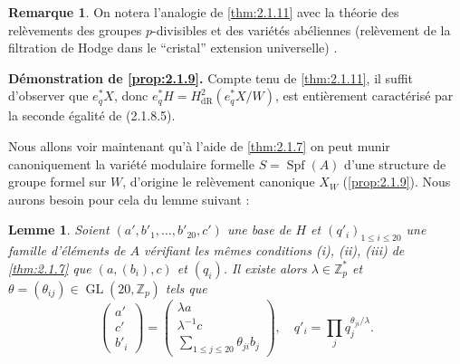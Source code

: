\documentclass[12pt,a4paper]{article}
\theoremstyle{plain}
\newtheorem{lemma}[theorem]{Lemme}
\theoremstyle{definition}
\newtheorem{remark}[theorem]{Remarque}
\theoremstyle{remark}
\DeclareMathOperator{\Spf}{Spf}
\providecommand{\GL}{\operatorname{GL}}
\begin{document}
\begin{remark}
On notera l'analogie de \ref{thm:2.1.11} avec la th\'eorie des rel\`evements des groupes $p$-divisibles et des vari\'et\'es ab\'eliennes (rel\`evement de la filtration de Hodge dans le ``cristal'' extension universelle) \cite{Messing}.
\end{remark}

\textbf{D\'emonstration de \ref{prop:2.1.9}.} Compte tenu de \ref{thm:2.1.11}, il suffit d'observer que $e_q^*X$, donc $e_q^* H = H^2_\mathrm{dR}(e_q^*X/W)$, est enti\`erement caract\'eris\'e par la seconde \'egalit\'e de (2.1.8.5).

Nous allons voir maintenant qu'\`a l'aide de \ref{thm:2.1.7} on peut munir canoniquement la vari\'et\'e modulaire formelle $S = \Spf(A)$ d'une structure de groupe formel sur $W$, d'origine le rel\`evement canonique $X_W$ (\ref{prop:2.1.9}). Nous aurons besoin pour cela du lemme suivant :

\begin{lemma}\label{lem:2.1.13}
Soient $(a', b'_1, \ldots, b'_{20}, c')$ une base de $H$ et $(q'_i)_{1\leqslant i\leqslant 20}$ une famille d'\'el\'ements de $A$ v\'erifiant les m\^emes conditions (i), (ii), (iii) de \ref{thm:2.1.7} que $(a, (b_i), c)$ et $(q_i)$. Il existe alors $\lambda \in \mathbb{Z}_p^*$ et $\theta = (\theta_{ij}) \in \GL(20, \mathbb{Z}_p)$ tels que
\begin{equation}\tag{2.1.13.1}
\begin{pmatrix}
a' \\ c' \\ b'_i
\end{pmatrix}
=
\begin{pmatrix}
\lambda a \\ \lambda^{-1} c \\ \displaystyle\sum_{1\leqslant j\leqslant 20} \theta_{ji} b_j
\end{pmatrix},
\quad
q'_i = \prod_j q_j^{\theta_{ji}/\lambda}. 
\end{equation}
\end{lemma}
\end{document}
